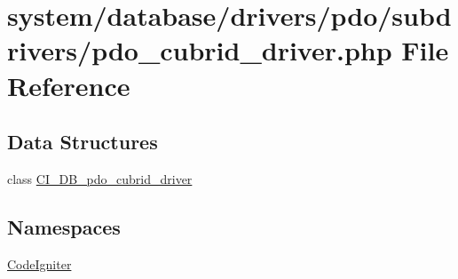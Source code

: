 \hypertarget{pdo__cubrid__driver_8php}{}\section{system/database/drivers/pdo/subdrivers/pdo\+\_\+cubrid\+\_\+driver.php File Reference}
\label{pdo__cubrid__driver_8php}
\subsection*{Data Structures}
\begin{DoxyCompactItemize}
\item 
class \mbox{\hyperlink{class_c_i___d_b__pdo__cubrid__driver}{C\+I\+\_\+\+D\+B\+\_\+pdo\+\_\+cubrid\+\_\+driver}}
\end{DoxyCompactItemize}
\subsection*{Namespaces}
\begin{DoxyCompactItemize}
\item 
 \mbox{\hyperlink{namespace_code_igniter}{Code\+Igniter}}
\end{DoxyCompactItemize}
